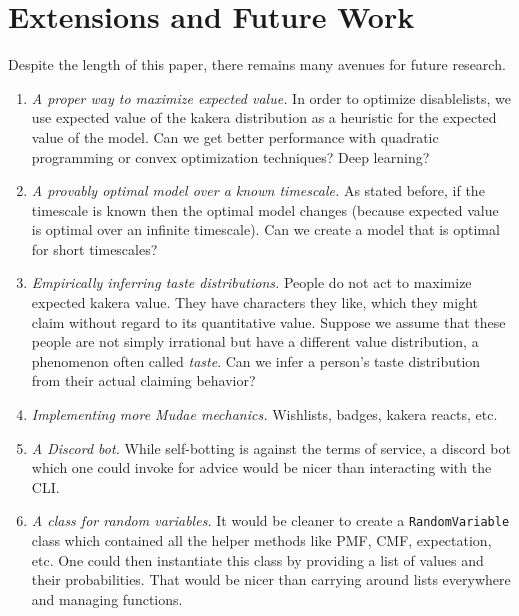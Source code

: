 \documentclass[11pt, oneside]{article}
\theoremstyle{plain}
\theoremstyle{definition}
\begin{document}
\newpage

\section{Extensions and Future Work}
Despite the length of this paper, there
remains many avenues for future research.
\begin{enumerate}
  \item \textit{A proper way to maximize expected value.}
    In order to optimize disablelists, we use expected value of the
    kakera distribution as a heuristic for the expected value of the
    model. Can we get better performance with quadratic programming
    or convex optimization techniques? Deep learning?

  \item \textit{A provably optimal model over a known timescale.}
    As stated before, if the timescale is known then the optimal
    model changes (because expected value is optimal over an infinite
    timescale). Can we create a model that is optimal for short timescales?

  \item \textit{Empirically inferring taste distributions.}
    People do not act to maximize expected kakera value. They have characters
    they like, which they might claim without regard to its quantitative value.
    Suppose we assume that these people are not simply irrational but have a
    different value distribution, a phenomenon often called \textit{taste}. Can
    we infer a person's taste distribution from their actual claiming behavior?

  \item \textit{Implementing more Mudae mechanics.}
    Wishlists, badges, kakera reacts, etc.

  \item \textit{A Discord bot.}
    While self-botting is against the terms of service, a discord bot which
    one could invoke for advice would be nicer than interacting with the CLI.

  \item \textit{A class for random variables.}
    It would be cleaner to create a \texttt{RandomVariable} class which
    contained all the helper methods like PMF, CMF, expectation, etc. One
    could then instantiate this class by providing a list of values and
    their probabilities. That would be nicer than carrying around lists
    everywhere and managing functions.
\end{enumerate}
\end{document}
